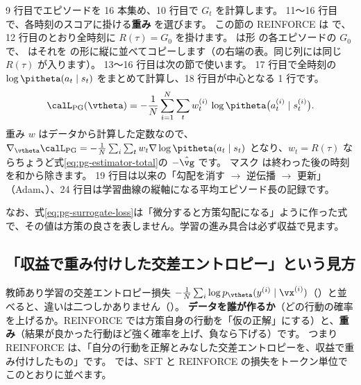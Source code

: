 9 行目でエピソードを 16 本集め、10 行目で $G_t$ を計算します。
11〜16 行目で、各時刻のスコアに掛ける\textbf{重み}  を選びます。
この節の REINFORCE は  で、12 行目のとおり全時刻に $R(\tau)=G_0$ を掛けます。
 は形  の各エピソードの $G_0$ で、 はそれを  の形に縦に並べてコピーします（の右端の表。同じ列には同じ $R(\tau)$ が入ります）。
13〜16 行目は次の節で使います。
17 行目で全時刻の $\log\pitheta(a_t\mid s_t)$ をまとめて計算し、18 行目が中心となる 1 行です。
\begin{equation}
\calL_{\text{PG}}(\vtheta)=-\frac{1}{N}\sum_{i=1}^{N}\sum_{t}w^{(i)}_t\,\log\pitheta\bigl(a^{(i)}_t\mid s^{(i)}_t\bigr).
\label{eq:pg-surrogate-loss}
\end{equation}
重み $w$ はデータから計算した定数なので、$\nabla_{\vtheta}\calL_{\text{PG}}=-\frac1N\sum_i\sum_t w_t\nabla\log\pitheta(a_t\mid s_t)$ となり、$w_t=R(\tau)$ ならちょうど式\eqref{eq:pg-estimator-total}の $-\hat{\vg}$ です。
マスク  は終わった後の時刻を和から除きます。
19 行目は以来の「勾配を消す $\to$ 逆伝播 $\to$ 更新」（Adam、）、24 行目は学習曲線の縦軸になる平均エピソード長の記録です。

なお、式\eqref{eq:pg-surrogate-loss}は「微分すると方策勾配になる」ように作った式で、その値は方策の良さを表しません。学習の進み具合は必ず収益で見ます。

\subsection*{「収益で重み付けした交差エントロピー」という見方}

教師あり学習の交差エントロピー損失 $-\frac1N\sum_i\log p_{\vtheta}(y^{(i)}\mid\vx^{(i)})$（）と並べると、違いは二つしかありません（）。
\textbf{データを誰が作るか}（どの行動の確率を上げるか。REINFORCE では方策自身の行動を「仮の正解」にする）と、\textbf{重み}（結果が良かった行動ほど強く確率を上げ、負なら下げる）です。
つまり REINFORCE は、「自分の行動を正解とみなした交差エントロピーを、収益で重み付けしたもの」です。
では、SFT と REINFORCE の損失をトークン単位でこのとおりに並べます。

